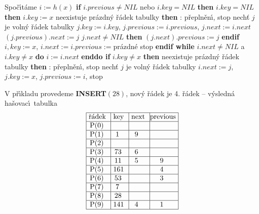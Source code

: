 Spo\v c\'\i t\'ame $i:=h\left(x\right)$\newline 
{\bf if} $i.previous\ne NIL$ nebo $i.key= NIL$ {\bf then}\newline
\phantom{---}{\bf if} $i.key=NIL$ {\bf then}\newline 
\phantom{------}$i.key:=x$\newline 
\phantom{---}{\bf else}\newline 
\phantom{------}{\bf if} neexistuje pr\'azdn\'y \v r\'adek tabulky {\bf then}\newline 
\phantom{---------}{\bf V\'ystup}: p\v repln\v en\'\i , stop\newline 
\phantom{------}{\bf else}\newline 
\phantom{---------}nech\v t $j$ je voln\'y \v r\'adek tabulky\newline 
\phantom{---------}$j.key:=i.key$, $j.previous:=i.previous$, $j.next
:=i.next$\newline 
\phantom{---------}$\left(j.previous\right).next:=j$\newline 
\phantom{---------}{\bf if} $j.next\ne NIL$ {\bf then} $\left(j.next\right).previous:=j$ {\bf endif}\newline 
\phantom{---------}$i,key:=x$, $i.next:=i.previous:=$pr\'azdn\'e\newline 
\phantom{------}{\bf endif}\newline 
\phantom{---}{\bf endif}\newline
\phantom{---}stop\newline
{\bf endif\newline
while} $i.next\ne NIL$ a $i.key\ne x$ {\bf do} $i:=i.next$ {\bf enddo\newline 
if} $i.key\ne x$ {\bf then}\newline 
\phantom{---}{\bf if} neexistuje pr\'azdn\'y \v r\'adek tabulky {\bf then}\newline 
\phantom{------}{\bf V\'ystup}: p\v repln\v en\'\i , stop\newline 
\phantom{---}{\bf else}\newline 
\phantom{------}nech\v t $j$ je voln\'y \v r\'adek tabulky\newline 
\phantom{------}$i.next:=j$, $j.key:=x$, $j.previous:=i$, stop\newline 
\phantom{---}{\bf endif\newline 
endif\newline 
endif}
\bigskip

\flushpar V p\v r\'\i kladu provedeme {\bf INSERT$\left(28\right)$}, nov\'y \v r\'adek je 4. \v r\'adek\newline 
-- v\'ysledn\'a ha\v sovac\'\i\ tabulka
$$\vtop{\offinterlineskip\halign {\strut\vrule\ # & \vrule\ # & \vrule\ # & \vrule \hfil # \hfil \vrule\cr\noalign{\hrule}\v r\'adek & key & next & previous\hfil \cr\noalign{\hrule}P(0) & & &\hfill \cr\noalign{\hrule}P(1) & 1 & 9 &\hfill \cr\noalign{\hrule}P(2) & & &\hfill \cr\noalign{\hrule}P(3) & 73 & 6 &\hfill \cr\noalign{\hrule}P(4) & 11 & 5 & 9 \cr\noalign{\hrule}P(5) & 161 & & 4 \cr\noalign{\hrule}P(6) & 53 & & 3 \cr\noalign{\hrule}P(7) & 7 & &\hfill \cr\noalign{\hrule}P(8) & 28 &  &\hfill  \cr\noalign{\hrule}P(9) & 141 & 4 & 1 \cr\noalign{\hrule}}}$$

